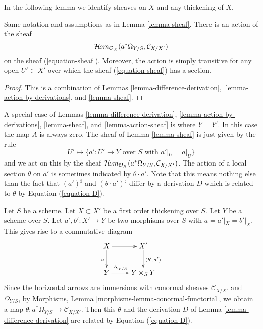 \noindent
In the following lemma we identify sheaves on $X$ and any thickening
of $X$.

\begin{lemma}
\label{lemma-action-sheaf}
Same notation and assumptions as in Lemma \ref{lemma-sheaf}.
There is an action of the sheaf
$$
\mathop{\mathcal{H}\!{\it om}}\nolimits_{\mathcal{O}_X}(a^*\Omega_{Y/S}, \mathcal{C}_{X/X'})
$$
on the sheaf (\ref{equation-sheaf}). Moreover, the action
is simply transitive for any open $U' \subset X'$ over which the sheaf
(\ref{equation-sheaf}) has a section.
\end{lemma}

\begin{proof}
This is a combination of
Lemmas \ref{lemma-difference-derivation},
\ref{lemma-action-by-derivations},
and \ref{lemma-sheaf}.
\end{proof}

\begin{remark}
\label{remark-special-case}
A special case of
Lemmas \ref{lemma-difference-derivation},
\ref{lemma-action-by-derivations},
\ref{lemma-sheaf}, and
\ref{lemma-action-sheaf}
is where $Y = Y'$. In this case the map $A$ is always zero.
The sheaf of
Lemma \ref{lemma-sheaf}
is just given by the rule
$$
U' \mapsto
\{a' : U' \to Y\text{ over }S\text{ with } a'|_U = a|_U\}
$$
and we act on this by the sheaf
$\mathop{\mathcal{H}\!{\it om}}\nolimits_{\mathcal{O}_X}(a^*\Omega_{Y/S}, \mathcal{C}_{X/X'})$.
The action of a local section $\theta$ on $a'$ is sometimes indicated by
$\theta \cdot a'$. Note that this means nothing else than the fact
that $(a')^\sharp$ and $(\theta \cdot a')^\sharp$ differ by a derivation
$D$ which is related to $\theta$ by Equation (\ref{equation-D}).
\end{remark}

\begin{lemma}
\label{lemma-omega-deformation}
Let $S$ be a scheme. Let $X \subset X'$ be a first order thickening over
$S$. Let $Y$ be a scheme over $S$. Let
$a', b' : X' \to Y$ be two morphisms over $S$ with
$a = a'|_X = b'|_X$. This gives rise to a commutative diagram
$$
\xymatrix{
X \ar[r] \ar[d]_a & X' \ar[d]^{(b', a')} \\
Y \ar[r]^-{\Delta_{Y/S}} & Y \times_S Y
}
$$
Since the horizontal arrows are immersions with conormal sheaves
$\mathcal{C}_{X/X'}$ and $\Omega_{Y/S}$, by
Morphisms, Lemma \ref{morphisms-lemma-conormal-functorial},
we obtain a map $\theta : a^*\Omega_{Y/S} \to \mathcal{C}_{X/X'}$.
Then this $\theta$ and the derivation $D$ of
Lemma \ref{lemma-difference-derivation}
are related by Equation (\ref{equation-D}).
\end{lemma}

